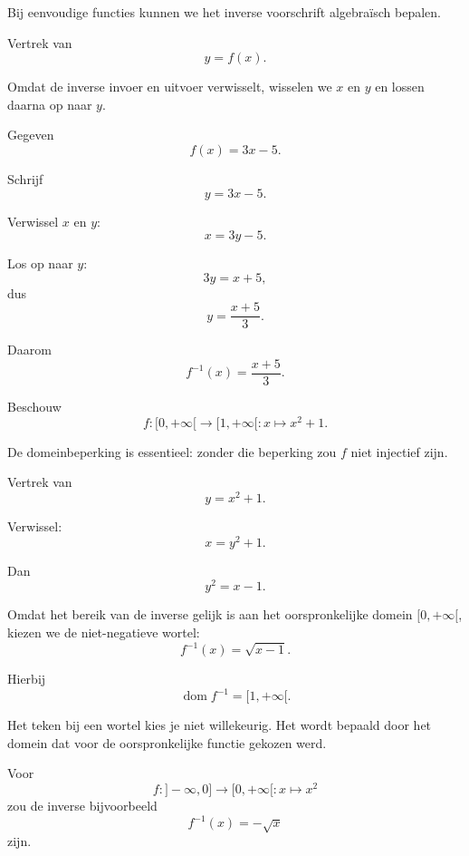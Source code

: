\documentclass{ximera}
\begin{document}


Bij eenvoudige functies kunnen we het inverse voorschrift algebraïsch bepalen.

Vertrek van
\[
y=f(x).
\]

Omdat de inverse invoer en uitvoer verwisselt, wisselen we \(x\) en \(y\)
en lossen daarna op naar \(y\).

\begin{voorbeeld}

Gegeven
\[
f(x)=3x-5.
\]

Schrijf
\[
y=3x-5.
\]

Verwissel \(x\) en \(y\):
\[
x=3y-5.
\]

Los op naar \(y\):
\[
3y=x+5,
\]
dus
\[
y=\frac{x+5}{3}.
\]

Daarom
\[
\boxed{f^{-1}(x)=\frac{x+5}{3}.}
\]
\end{voorbeeld}

\begin{voorbeeld}

Beschouw
\[
f:[0,+\infty[\to[1,+\infty[:x\mapsto x^2+1.
\]

De domeinbeperking is essentieel: zonder die beperking zou \(f\) niet
injectief zijn.

Vertrek van
\[
y=x^2+1.
\]

Verwissel:
\[
x=y^2+1.
\]

Dan
\[
y^2=x-1.
\]

Omdat het bereik van de inverse gelijk is aan het oorspronkelijke domein
\([0,+\infty[\), kiezen we de niet-negatieve wortel:
\[
\boxed{f^{-1}(x)=\sqrt{x-1}.}
\]

Hierbij
\[
\operatorname{dom}f^{-1}=[1,+\infty[.
\]
\end{voorbeeld}

\begin{opmerking}
Het teken bij een wortel kies je niet willekeurig. Het wordt bepaald door
het domein dat voor de oorspronkelijke functie gekozen werd.

Voor
\[
f:]-\infty,0]\to[0,+\infty[:x\mapsto x^2
\]
zou de inverse bijvoorbeeld
\[
f^{-1}(x)=-\sqrt{x}
\]
zijn.
\end{opmerking}

\end{document}
